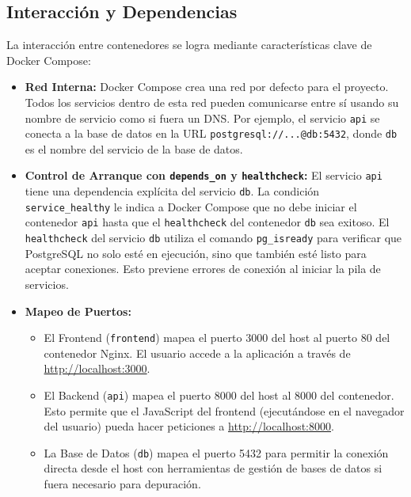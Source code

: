 \documentclass[12pt, a4paper]{article}
\begin{document}
\subsection{Interacción y Dependencias}
La interacción entre contenedores se logra mediante características clave de Docker Compose:

\begin{itemize}
    \item \textbf{Red Interna:} Docker Compose crea una red por defecto para el proyecto. Todos los servicios dentro de esta red pueden comunicarse entre sí usando su nombre de servicio como si fuera un DNS. Por ejemplo, el servicio \texttt{api} se conecta a la base de datos en la URL \texttt{postgresql://...@db:5432}, donde \texttt{db} es el nombre del servicio de la base de datos.
    
    \item \textbf{Control de Arranque con \texttt{depends\_on} y \texttt{healthcheck}:}
    El servicio \texttt{api} tiene una dependencia explícita del servicio \texttt{db}. La condición \texttt{service\_healthy} le indica a Docker Compose que no debe iniciar el contenedor \texttt{api} hasta que el \texttt{healthcheck} del contenedor \texttt{db} sea exitoso.
    El \texttt{healthcheck} del servicio \texttt{db} utiliza el comando \texttt{pg\_isready} para verificar que PostgreSQL no solo esté en ejecución, sino que también esté listo para aceptar conexiones. Esto previene errores de conexión al iniciar la pila de servicios.
    
    \item \textbf{Mapeo de Puertos:}
    \begin{itemize}
        \item El Frontend (\texttt{frontend}) mapea el puerto 3000 del host al puerto 80 del contenedor Nginx. El usuario accede a la aplicación a través de \href{http://localhost:3000}{http://localhost:3000}.
        \item El Backend (\texttt{api}) mapea el puerto 8000 del host al 8000 del contenedor. Esto permite que el JavaScript del frontend (ejecutándose en el navegador del usuario) pueda hacer peticiones a \href{http://localhost:8000}{http://localhost:8000}.
        \item La Base de Datos (\texttt{db}) mapea el puerto 5432 para permitir la conexión directa desde el host con herramientas de gestión de bases de datos si fuera necesario para depuración.
    \end{itemize}
\end{itemize}
\end{document}
